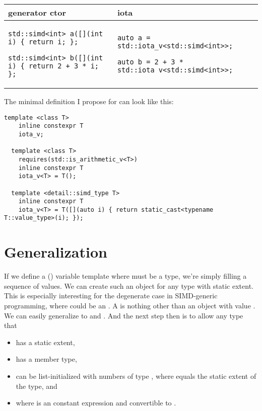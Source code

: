 \begingroup
  \smaller[1]
\begin{tabular}{p{}|p{}}
  generator ctor & iota \\
  \hline
  \begin{lstlisting}
std::simd<int> a([](int i) { return i; };

std::simd<int> b([](int i) { return 2 + 3 * i; };
  \end{lstlisting}
  &
  \begin{lstlisting}
auto a = std::iota_v<std::simd<int>>;

auto b = 2 + 3 * std::iota_v<std::simd<int>>;
  \end{lstlisting}
\end{tabular}
\endgroup

The minimal definition I propose for \simd can look like this:
\medskip\begin{lstlisting}[style=Vc]
  template <class T>
    inline constexpr T
    iota_v;

  template <class T>
    requires(std::is_arithmetic_v<T>)
    inline constexpr T
    iota_v<T> = T();

  template <detail::simd_type T>
    inline constexpr T
    iota_v<T> = T([](auto i) { return static_cast<typename T::value_type>(i); });
\end{lstlisting}


\section{Generalization}
If we define a () variable template \std{} where
 must be a \simd type, we're simply filling a sequence of values.
We can create such an object for any type with static extent.
This is especially interesting for the degenerate case in SIMD-generic
programming, where  could \eg be an .
A \std{} is nothing other than an object  with value
.
We can easily generalize to  and
.
And the next step then is to allow any type that
\begin{itemize}
  \item has a static extent,
  \item has a  member type,
  \item can be list-initialized with  numbers of type
    , where  equals the static extent of the type, and
  \item where  is an constant expression and convertible to .
\end{itemize}

